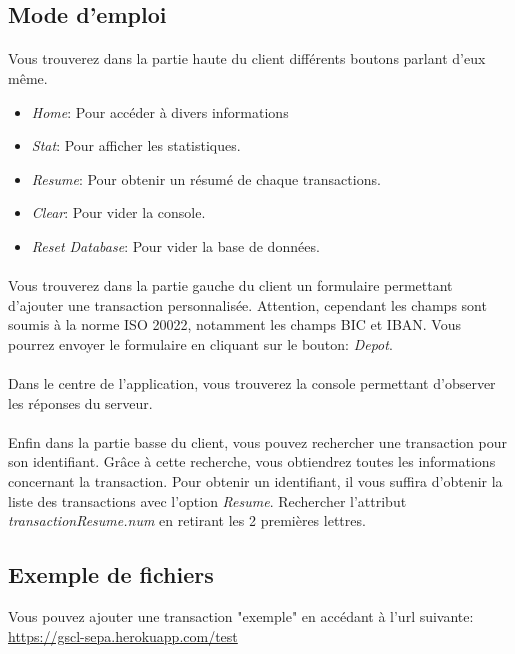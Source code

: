 \documentclass{article}
\begin{document}
    \subsection{Mode d’emploi}
      \paragraph{}
	Vous trouverez dans la partie haute du client différents boutons parlant d'eux même. 
	\begin{itemize}
	 \item \emph{Home}: Pour accéder à divers informations
	 \item \emph{Stat}: Pour afficher les statistiques.
	 \item \emph{Resume}: Pour obtenir un résumé de chaque transactions.
	 \item \emph{Clear}: Pour vider la console.
	 \item \emph{Reset Database}: Pour vider la base de données.
	\end{itemize}

      \paragraph{}
	Vous trouverez dans la partie gauche du client un formulaire permettant d'ajouter une transaction personnalisée.
	Attention, cependant les champs sont soumis à la norme ISO 20022, notamment les champs BIC et IBAN.
	Vous pourrez envoyer le formulaire en cliquant sur le bouton: \emph{Depot}.
      \paragraph{}
	Dans le centre de l'application, vous trouverez la console permettant d'observer les réponses du serveur.
      \paragraph{}
	Enfin dans la partie basse du client, vous pouvez rechercher une transaction pour son identifiant.
	Grâce à cette recherche, vous obtiendrez toutes les informations concernant la transaction.
	Pour obtenir un identifiant, il vous suffira d'obtenir la liste des transactions avec l'option \emph{Resume}.
	Rechercher l'attribut \emph{transactionResume.num} en retirant les 2 premières lettres.
    \subsection{Exemple de fichiers}
      Vous pouvez ajouter une transaction "exemple" en accédant à l'url suivante: \\
      \url{https://gscl-sepa.herokuapp.com/test}
      
\end{document}
